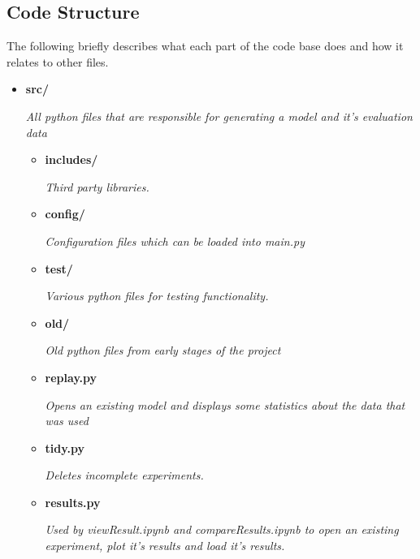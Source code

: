     \subsection{Code Structure} \label{sec:codestruct}
      The following briefly describes what each part of the code base does and how it relates
      to other files.
      {\small
      \begin{itemize}
        \item   {\bf src/}
                \begin{sloppypar} \textit{All python files that are responsible for generating a model and it's evaluation data}\end{sloppypar}
                \begin{itemize}
                  \item {\bf includes/ }
                  \begin{sloppypar} \textit{Third party libraries.}\end{sloppypar}
                  \item {\bf config/ }
                  \begin{sloppypar} \textit{Configuration files which can be loaded into main.py}\end{sloppypar}
                  \item {\bf test/ }
                  \begin{sloppypar} \textit{Various python files for testing functionality.}\end{sloppypar}
                  \item {\bf old/ }
                  \begin{sloppypar} \textit{Old python files from early stages of the project}\end{sloppypar}
                  \item {\bf replay.py }
                  \begin{sloppypar} \textit{Opens an existing model and displays some statistics about the data that was used}\end{sloppypar}
                  \item {\bf tidy.py }
                  \begin{sloppypar} \textit{Deletes incomplete experiments.}\end{sloppypar}
                  \item {\bf results.py }
                  \begin{sloppypar} \textit{Used by viewResult.ipynb and compareResults.ipynb to open an existing experiment, plot it's results and load it's results.}\end{sloppypar}

\end{itemize}
\end{itemize}}
